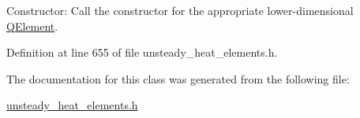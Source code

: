 Constructor\+: Call the constructor for the appropriate lower-\/dimensional \hyperlink{classoomph_1_1QElement}{Q\+Element}. 



Definition at line 655 of file unsteady\+\_\+heat\+\_\+elements.\+h.



The documentation for this class was generated from the following file\+:\begin{DoxyCompactItemize}
\item 
\hyperlink{unsteady__heat__elements_8h}{unsteady\+\_\+heat\+\_\+elements.\+h}\end{DoxyCompactItemize}
